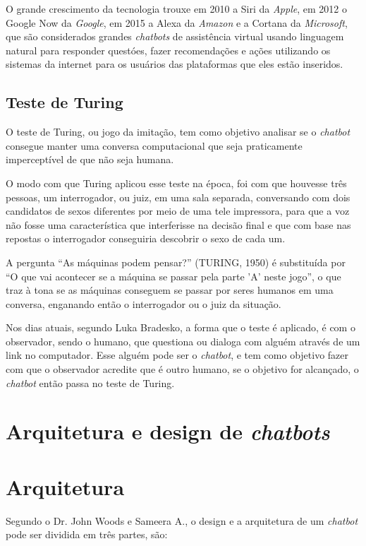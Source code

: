 \documentclass[
	12pt,				%
	oneside,
	a4paper,			%
	english,			%
	french,				%
	spanish,			%
	brazil				%
	]{abntex2}
\begin{document}
O grande crescimento da tecnologia trouxe em 2010 a Siri da \emph{Apple}, em 2012 o Google Now da \emph{Google}, em 2015 a Alexa da \emph{Amazon} e a Cortana da \emph{Microsoft}, que são considerados grandes \emph{chatbots} de assistência virtual usando linguagem natural para responder questóes, fazer recomendações e ações utilizando os sistemas da internet para os usuários das plataformas que eles estão inseridos.


\subsection{Teste de Turing}
O teste de Turing, ou jogo da imitação, tem como objetivo analisar se o \emph{chatbot} consegue manter uma conversa computacional que seja praticamente imperceptível de que não seja humana.

O modo com que Turing aplicou esse teste na época, foi com que houvesse três pessoas, um interrogador, ou juiz, em uma sala separada, conversando com dois candidatos de sexos diferentes por meio de uma tele impressora, para que a voz não fosse uma característica que interferisse na decisão final e que com base nas repostas o interrogador conseguiria descobrir o sexo de cada um.

A pergunta “As máquinas podem pensar?” (TURING, 1950) é substituída por “O que vai acontecer se a máquina se passar pela parte 'A' neste jogo”, o que traz à tona se as máquinas conseguem se passar por seres humanos em uma conversa, enganando então o interrogador ou o juiz da situação.\supercite{Turing}

Nos dias atuais, segundo Luka Bradesko\supercite{LukaBradesko}, a forma que o teste é aplicado, é com o observador, sendo o humano, que questiona ou dialoga com alguém através de um link no computador. Esse alguém pode ser o \emph{chatbot}, e tem como objetivo fazer com que o observador acredite que é outro humano, se o objetivo for alcançado, o \emph{chatbot} então passa no teste de Turing.


\section{Arquitetura e design de \emph{chatbots}}
\section{Arquitetura}
Segundo o Dr. John Woods e Sameera A.\supercite{Abdul-Kader2015}, o design e a arquitetura de um \emph{chatbot} pode ser dividida em três partes, são:
\end{document}
